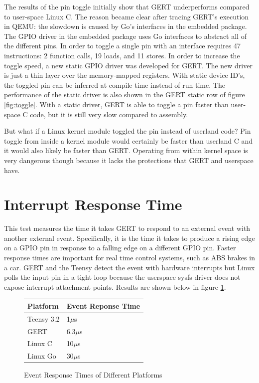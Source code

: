
The results of the pin toggle initially show that GERT underperforms compared to
user-space Linux C. The reason became clear after tracing GERT's execution in QEMU:
the slowdown is caused by Go's interfaces in the embedded package. The GPIO driver
in the embedded package uses Go interfaces to abstract all of the different pins.
In order to toggle a single pin with an interface requires 47 instructions:
2 function calls, 19 loads, and 11 stores. In order to increase the toggle speed,
a new static GPIO driver was developed for GERT. The new driver is just a thin layer
over the memory-mapped registers. With static device ID's, the toggled pin
can be inferred at compile time instead of run time.
The performance of the static driver is also shown in the GERT static row
of figure \ref{fig:toggle}. With a static driver, GERT is able to toggle a
pin faster than user-space C code, but it is still very slow compared to
assembly.

But what if a Linux kernel module toggled the pin instead of userland code?
Pin toggle from inside a kernel module would certainly be faster than userland
C and it would also likely be faster than GERT. Operating from within
kernel space is very dangerous though because it lacks the protections that
GERT and userspace have.

\section{Interrupt Response Time}\label{sec:int_time}
This test measures the time it takes GERT to respond to an external event
with another external event. Specifically, it is the time it takes to produce
a rising edge on a GPIO pin in response to a falling edge on a different GPIO pin.
Faster response times are important for real time control systems, such as ABS brakes
in a car.
GERT and the Teensy detect the event with hardware interrupts
but Linux polls the input pin in a tight loop because the userspace sysfs
driver does not expose interrupt attachment points.
Results are shown below in figure \ref{fig:RT}.

\begin{figure} [h]
\begin{center}
  \begin{tabular}{ | l | l |}
    \hline
    Platform & Event Reponse Time \\ \hline
    Teensy 3.2 & 1$\mu$s \\ \hline
    GERT & 6.3$\mu$s \\ \hline
    Linux C & 10$\mu$s \\ \hline
    Linux Go & 30$\mu$s \\
    \hline
  \end{tabular}
\end{center}
  \caption{Event Response Times of Different Platforms}  \label{fig:RT}
\end{figure}

